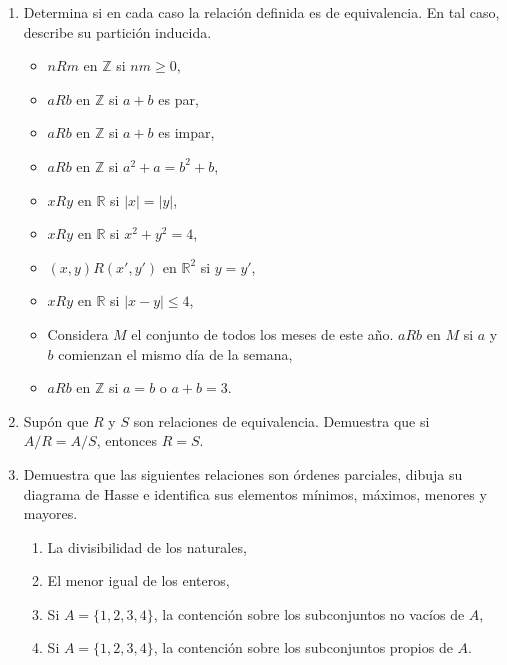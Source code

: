 \documentclass[11pt,answers]{exam}
\begin{document}
\begin{enumerate}
    \item Determina si en cada caso la relación definida es de equivalencia. En tal caso, describe su partición inducida.
    \begin{itemize}
        \item \( n R m \) en \( \mathbb{Z} \) si \( nm \geq 0 \),
        \item \( a R b \) en \( \mathbb{Z} \) si \( a + b \) es par,
        \item \( a R b \) en \( \mathbb{Z} \) si \( a + b \) es impar,
        \item \( a R b \) en \( \mathbb{Z} \) si \( a^2 + a = b^2 + b \),
        \item \( x R y \) en \( \mathbb{R} \) si \( |x| = |y| \),
        \item \( x R y \) en \( \mathbb{R} \) si \( x^2 + y^2 = 4 \),
        \item \( (x, y) R (x', y') \) en \( \mathbb{R}^2 \) si \( y = y' \),
        \item \( x R y \) en \( \mathbb{R} \) si \( |x - y| \leq 4 \),
        \item Considera \( M \) el conjunto de todos los meses de este año. \( a R b \) en \( M \) si \( a \) y \( b \) comienzan el mismo día de la semana,
        \item \( a R b \) en \( \mathbb{Z} \) si \( a = b \) o \( a + b = 3 \).
    \end{itemize}

    

    \item Supón que \( R \) y \( S \) son relaciones de equivalencia. Demuestra que si \( A/R = A/S \), entonces \( R = S \).

    

    \item Demuestra que las siguientes relaciones son órdenes parciales, dibuja su diagrama de Hasse e identifica sus elementos mínimos, máximos, menores y mayores.
    \begin{enumerate}
        \item La divisibilidad de los naturales,
        \item El menor igual de los enteros,
        \item Si \( A = \{1, 2, 3, 4\} \), la contención sobre los subconjuntos no vacíos de \( A \),
        \item Si \( A = \{1, 2, 3, 4\} \), la contención sobre los subconjuntos propios de \( A \).
    \end{enumerate}

    
    
    
\end{enumerate}
\end{document}
